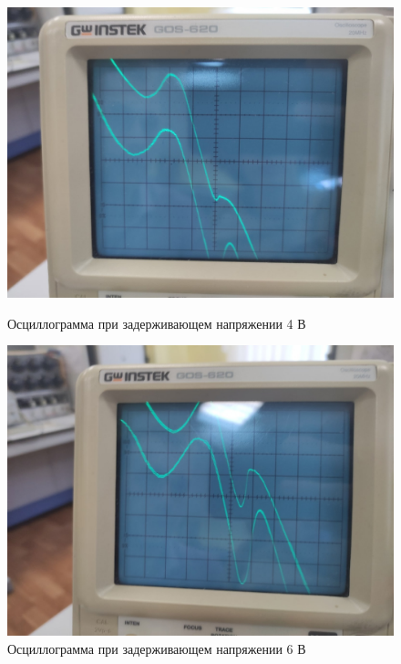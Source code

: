 \documentclass[a4paper, 12pt]{article}%
\begin{document}
\begin{enumerate}
\begin{figure}[h]
\begin{center}
\begin{minipage}[h]{0.45\linewidth}
\includegraphics[width=1\linewidth]{images/1.jpg}
\caption{Осциллограмма при задерживающем напряжении 4 В} %
\label{ris:experimoriginal} %
\end{minipage}
\hfill 
\begin{minipage}[h]{0.45\linewidth}
\includegraphics[width=1\linewidth]{images/2.jpg}
\caption{Осциллограмма при задерживающем напряжении 6 В}
\label{ris:experimcoded}
\end{minipage}
\hfill 
\begin{minipage}[h]{0.45\linewidth}

\end{minipage}
\end{center}
\end{figure}
\end{enumerate}
\end{document}
